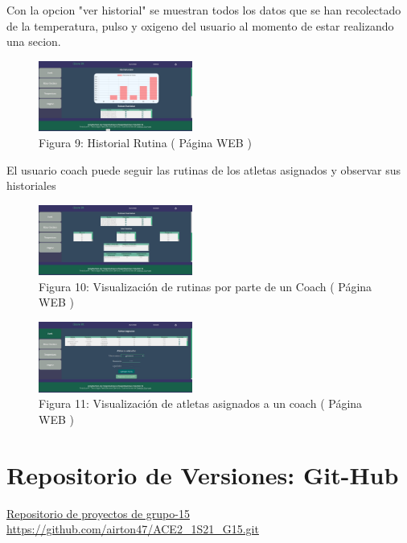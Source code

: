 \documentclass[osajnl,twocolumn,showpacs,superscriptaddress,10pt]{revtex4-1}
\begin{document}
    Con la opcion "ver historial" se muestran todos los datos que se han recolectado de la temperatura, pulso y oxigeno del usuario al momento de estar realizando una secion.
    
\begin{figure} [H] \centering 
\caption{Figura 9: Historial Rutina ( Página WEB )}
\includegraphics[width=0.45\textwidth]{hist.jpg}
\end{figure}

    El usuario coach puede seguir las rutinas de los atletas asignados y observar sus historiales
    
\begin{figure} [H] \centering 
\caption{Figura 10: Visualización de rutinas por parte de un Coach ( Página WEB )}
\includegraphics[width=0.45\textwidth]{HistAtle.jpg}
\end{figure}

\begin{figure} [H] \centering 
\caption{Figura 11: Visualización de atletas asignados a un coach ( Página WEB )}
\includegraphics[width=0.45\textwidth]{AsigAtle.jpg}
\end{figure}



\section{Repositorio de Versiones: Git-Hub}
\href{https://github.com/airton47/ACE2_1S21_G15.git}{Repositorio de proyectos de grupo-15 \newline}
\newline
\url{https://github.com/airton47/ACE2_1S21_G15.git}
\end{document}
